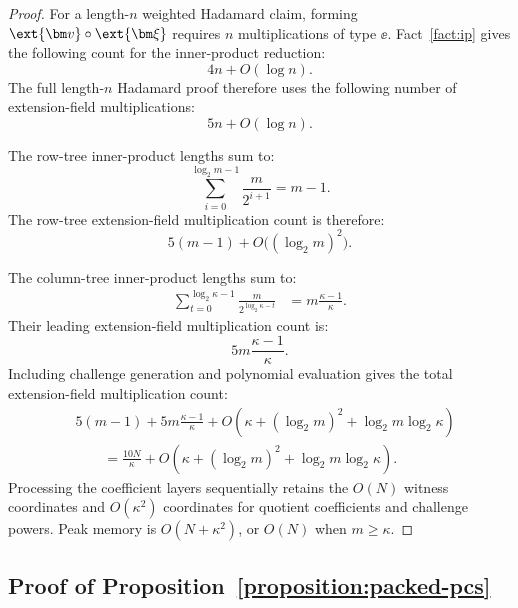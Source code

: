 \begin{proof}
For a length-\(n\) weighted Hadamard claim, forming
\(
    \ext{\bm v}\circ\ext{\bm\xi}
\)
requires \(n\) multiplications of type \(\ee\). Fact~\ref{fact:ip}
gives the following count for the inner-product reduction:
\[
    4n+O(\log n).
\]
The full length-\(n\) Hadamard proof therefore uses the following
number of extension-field multiplications:
\[
    5n+O(\log n).
\]

The row-tree inner-product lengths sum to:
\[
    \sum_{i=0}^{\log_2m-1}
    \frac{m}{2^{i+1}}
    =
    m-1.
\]
The row-tree extension-field multiplication count is therefore:
\[
    5(m-1)
    +
    O\bigl((\log_2m)^2\bigr).
\]

The column-tree inner-product lengths sum to:
\[
\begin{aligned}
    \sum_{t=0}^{\log_2\kappa-1}
    \frac{m}{2^{\log_2\kappa-t}}
    &=
    m\frac{\kappa-1}{\kappa}.
\end{aligned}
\]
Their leading extension-field multiplication count is:
\[
    5m\frac{\kappa-1}{\kappa}.
\]
Including challenge generation and polynomial evaluation gives
the total extension-field multiplication count:
\[
\begin{aligned}
    &5(m-1)
    +
    5m\frac{\kappa-1}{\kappa}
    +
    O\left(
        \kappa
        +
        (\log_2m)^2
        +
        \log_2m\log_2\kappa
    \right)\\
    &\qquad=
    \frac{10N}{\kappa}
    +
    O\left(
        \kappa
        +
        (\log_2m)^2
        +
        \log_2m\log_2\kappa
    \right).
\end{aligned}
\]
Processing the coefficient layers sequentially retains the
\(O(N)\) witness coordinates and \(O(\kappa^2)\) coordinates
for quotient coefficients and challenge powers. Peak memory is
\(O(N+\kappa^2)\), or \(O(N)\) when \(m\geq\kappa\).
\end{proof}

\subsection{Proof of Proposition~\ref{proposition:packed-pcs}}
\label{appx:proof-pcs}

